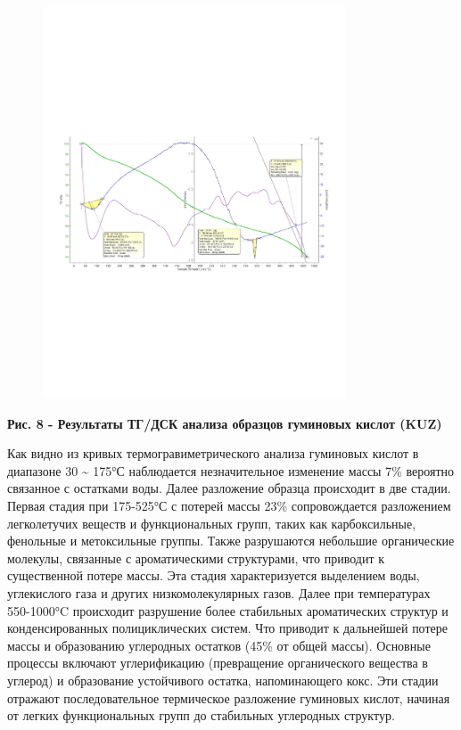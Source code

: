 \begin{figure}[H]
	\centering
	\includegraphics[width=0.8\textwidth]{media/gorn3/image19}
	\caption*{}
\end{figure}


{\bfseries Рис. 8 - Результаты ТГ/ДСК анализа образцов гуминовых кислот
(KUZ)}

Как видно из кривых термогравиметрического анализа гуминовых кислот в
диапазоне 30 \textasciitilde{} 175°С наблюдается незначительное
изменение массы 7\% вероятно связанное с остатками воды. Далее
разложение образца происходит в две стадии. Первая стадия при 175-525°С
с потерей массы 23\% сопровождается разложением легколетучих веществ и
функциональных групп, таких как карбоксильные, фенольные и метоксильные
группы. Также разрушаются небольшие органические молекулы, связанные с
ароматическими структурами, что приводит к существенной потере массы.
Эта стадия характеризуется выделением воды, углекислого газа и других
низкомолекулярных газов. Далее при температурах 550-1000°C происходит
разрушение более стабильных ароматических структур и конденсированных
полициклических систем. Что приводит к дальнейшей потере массы и
образованию углеродных остатков (45\% от общей массы). Основные процессы
включают углерификацию (превращение органического вещества в углерод) и
образование устойчивого остатка, напоминающего кокс. Эти стадии отражают
последовательное термическое разложение гуминовых кислот, начиная от
легких функциональных групп до стабильных углеродных структур.

